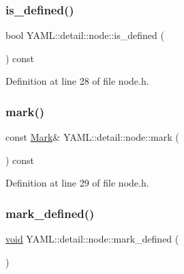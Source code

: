 \subsubsection{\texorpdfstring{is\_defined()}{is\_defined()}}
{\footnotesize\ttfamily bool Y\+A\+M\+L\+::detail\+::node\+::is\+\_\+defined (\begin{DoxyParamCaption}{ }\end{DoxyParamCaption}) const\hspace{0.3cm}{\ttfamily [inline]}}



Definition at line 28 of file node.\+h.

\mbox{\label{class_y_a_m_l_1_1detail_1_1node_a169bedca09bd0ee2b5b5a867f04ce4a0}} 
\subsubsection{\texorpdfstring{mark()}{mark()}}
{\footnotesize\ttfamily const \mbox{\hyperlink{struct_y_a_m_l_1_1_mark}{Mark}}\& Y\+A\+M\+L\+::detail\+::node\+::mark (\begin{DoxyParamCaption}{ }\end{DoxyParamCaption}) const\hspace{0.3cm}{\ttfamily [inline]}}



Definition at line 29 of file node.\+h.

\mbox{\label{class_y_a_m_l_1_1detail_1_1node_aaa0b5d4004dab426deedc9a06b2d25f6}} 
\subsubsection{\texorpdfstring{mark\_defined()}{mark\_defined()}}
{\footnotesize\ttfamily \mbox{\hyperlink{glad_8h_a950fc91edb4504f62f1c577bf4727c29}{void}} Y\+A\+M\+L\+::detail\+::node\+::mark\+\_\+defined (\begin{DoxyParamCaption}{ }\end{DoxyParamCaption})\hspace{0.3cm}{\ttfamily [inline]}}



